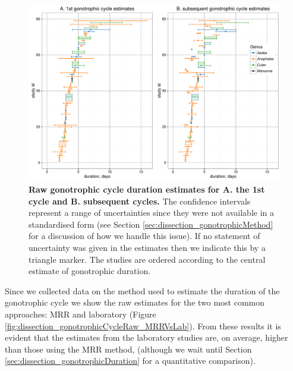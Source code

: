 \documentclass[12pt]{article}
\begin{document}
{\begin{figure}[ht]
	\centerline{\includegraphics[width=1\textwidth]{./Figure_files/dissection_gonotrophicCycleRaw.pdf}}
	\caption{\textbf{Raw gonotrophic cycle duration estimates for A. the 1st cycle and B. subsequent cycles.} The confidence intervals represent a range of uncertainties since they were not available in a standardised form (see Section \ref{sec:dissection_gonotrophicMethod} for a discussion of how we handle this issue). If no statement of uncertainty was given in the estimates then we indicate this by a triangle marker. The studies are ordered according to the central estimate of gonotrophic duration.}\label{fig:dissection_gonotrophicCycleRaw}
\end{figure}

Since we collected data on the method used to estimate the duration of the gonotrophic cycle we show the raw estimates for the two most common approaches: MRR and laboratory (Figure \ref{fig:dissection_gonotrophicCycleRaw_MRRVsLab}). From these results it is evident that the estimates from the laboratory studies are, on average, higher than those using the MRR method, (although we wait until Section \ref{sec:dissection_gonotrophicDuration} for a quantitative comparison).

}
\end{document}
